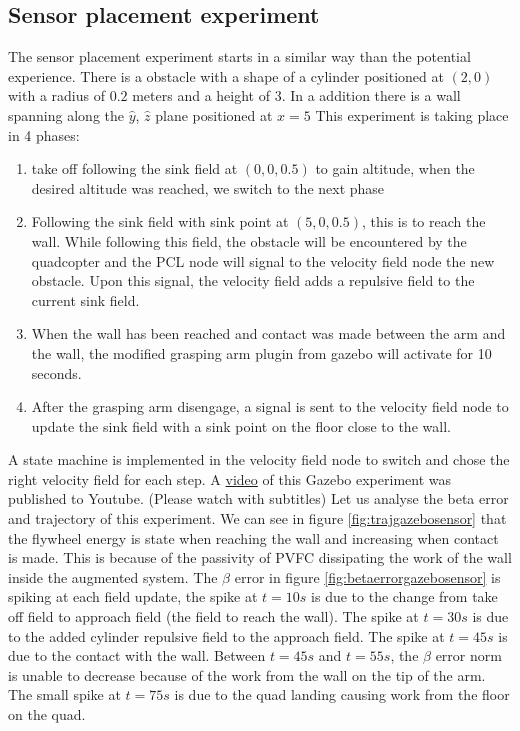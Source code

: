 \subsection{Sensor placement experiment}
The sensor placement experiment starts in a similar way than the potential experience. 
There is a obstacle with a shape of a cylinder positioned at $(2,0)$ with a radius of $0.2$ meters and a height of $3$.
In a addition there is a wall spanning along the $\hat{y}$, $\hat{z}$ plane positioned at $x=5$
This experiment is taking place in 4 phases:
\begin{enumerate}
   \item take off following the sink field at $(0,0,0.5)$ to gain altitude, when the desired altitude was reached, we switch to the next phase 
   \item Following the sink field with sink point at $(5,0,0.5)$, this is to reach the wall. While following this field, the obstacle will be encountered by the quadcopter and the PCL node will signal to the velocity field node the new obstacle. Upon this signal, the velocity field adds a repulsive field to the current sink field. 
   \item When the wall has been reached and contact was made between the arm and the wall, the modified grasping arm plugin from gazebo will activate for 10 seconds.
   \item After the grasping arm disengage, a signal is sent to the velocity field node to update the sink field with a sink point on the floor close to the wall.
\end{enumerate}
A state machine is implemented in the velocity field node to switch and chose the right velocity field for each step. 
A \href{https://www.youtube.com/watch?v=bR4PmFp38t0}{video} of this Gazebo experiment was published to Youtube. (Please watch with subtitles)
Let us analyse the beta error and trajectory of this experiment.
We can see in figure \ref{fig:trajgazebosensor} that the flywheel energy is state when reaching the wall and increasing when contact is made. This is because of the passivity of PVFC dissipating the work of the wall inside the augmented system.
The $\beta$ error in figure \ref{fig:betaerrorgazebosensor} is spiking at each field update, the spike at $t=10s$ is due to the change from take off field to approach field (the field to reach the wall). 
The spike at $t=30s$ is due to the added cylinder repulsive field to the approach field.
The spike at $t=45s$ is due to the contact with the wall. Between $t=45s$ and $t=55s$, the $\beta$ error norm is unable to decrease because of the work from the wall on the tip of the arm. 
The small spike at $t=75s$ is due to the quad landing causing work from the floor on the quad.

